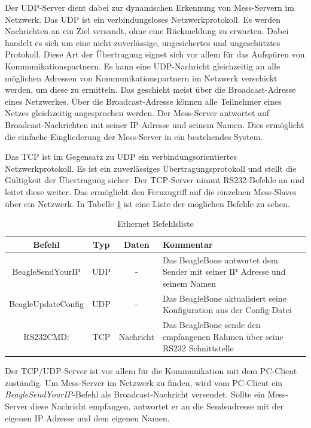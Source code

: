 Der UDP-Server dient dabei zur dynamischen Erkennung von Mess-Servern im Netzwerk. Das \ac{UDP} ist ein verbindungsloses Netzwerkprotokoll. Es werden Nachrichten an ein Ziel versandt, ohne eine Rückmeldung zu erwarten. Dabei handelt es sich um eine nicht-zuverlässige, ungesichertes und ungeschütztes Protokoll. Diese Art der Übertragung eignet sich vor allem für das Aufspüren von Kommunikationspartnern. Es kann eine UDP-Nachricht gleichzeitig an alle möglichen Adressen von Kommunikationspartnern im Netzwerk verschickt werden, um diese zu ermitteln. Das geschieht meist über die Broadcast-Adresse eines Netzwerkes. Über die Broadcast-Adresse können alle Teilnehmer eines Netzes gleichzeitig angesprochen werden. Der Mess-Server antwortet auf Broadcast-Nachrichten mit seiner IP-Adresse und seinem Namen. Dies ermöglicht die einfache Eingliederung der Mess-Server in ein bestehendes System.\ 

Das \ac{TCP} ist im Gegensatz zu \ac{UDP} ein verbindungsorientiertes Netzwerkprotokoll. Es ist ein zuverlässiges Übertragungsprotokoll und stellt die Gültigkeit der Übertragung sicher. Der TCP-Server nimmt RS232-Befehle an und leitet diese weiter. Das ermöglicht den Fernzugriff auf die einzelnen Mess-Slaves über ein Netzwerk. In Tabelle \ref{table_EthernetCommands} ist eine Liste der möglichen Befehle zu sehen.\\

\begin{table}[H]
\begin{center}
\begin{tabularx}{\textwidth}{|c|c|c|X|}\hline 
 Befehl & Typ & Daten & Kommentar \\ \hline
 BeagleSendYourIP & UDP & - & Das BeagleBone antwortet dem Sender mit seiner IP Adresse und seinem Namen  \\ \hline
 BeagleUpdateConfig & UDP & - & Das BeagleBone aktualisiert seine Konfiguration aus der Config-Datei \\ \hline
 RS232CMD: & TCP & Nachricht & Das BeagleBone sende den empfangenen Rahmen über seine RS232 Schnittstelle \\ \hline
\end{tabularx}
\caption{Ethernet Befehlsliste}
\label{table_EthernetCommands}
\end{center}
\end{table}

Der TCP/UDP-Server ist vor allem für die Kommunikation mit dem PC-Client zuständig. Um Mess-Server im Netzwerk zu finden, wird vom PC-Client ein \textit{BeagleSendYourIP}-Befehl als Broadcast-Nachricht versendet. Sollte ein Mess-Server diese Nachricht empfangen, antwortet er an die Sendeadresse mit der eigenen IP Adresse und dem eigenen Namen.\ 

